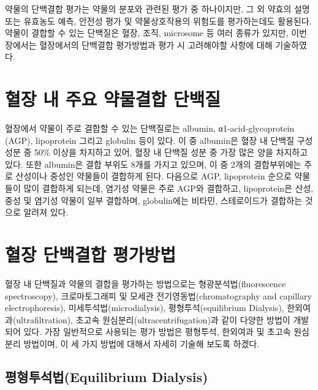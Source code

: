 \documentclass[
  11pt,
  krantz2, a4paper, twoside]{krantz}
\begin{document}
약물의 단백결합 평가는 약물의 분포와 관련된 평가 중 하나이지만, 그 외 약효의 설명 또는 유효농도 예측, 안전성 평가 및 약물상호작용의 위험도를 평가하는데도 활용된다. 약물이 결합할 수 있는 단백질은 혈장, 조직, microsome 등 여러 종류가 있지만, 이번 장에서는 혈장에서의 단백결합 평가방법과 평가 시 고려해야할 사항에 대해 기술하였다.

\hypertarget{uxd608uxc7a5-uxb0b4-uxc8fcuxc694-uxc57duxbb3cuxacb0uxd569-uxb2e8uxbc31uxc9c8}{%
\section{혈장 내 주요 약물결합 단백질}\label{uxd608uxc7a5-uxb0b4-uxc8fcuxc694-uxc57duxbb3cuxacb0uxd569-uxb2e8uxbc31uxc9c8}}

혈장에서 약물이 주로 결합할 수 있는 단백질로는 albumin,
α1-acid-glycoprotein (AGP), lipoprotein 그리고 globulin 등이 있다. 이 중
albumin은 혈장 내 단백질 구성 성분 중 50\% 이상을 차지하고 있어, 혈장 내
단백질 성분 중 가장 많은 양을 차지하고 있다. 또한 albumin은 결합 부위도
8개를 가지고 있으며, 이 중 2개의 결합부위에는 주로 산성이나 중성인
약물들이 결합하게 된다. 다음으로 AGP, lipoprotein 순으로 약물들이 많이
결합하게 되는데, 염기성 약물은 주로 AGP와 결합하고, lipoprotein은 산성,
중성 및 염기성 약물이 일부 결합하며, globulin에는 비타민, 스테로이드가
결합하는 것으로 알려져 있다.

\hypertarget{uxd608uxc7a5-uxb2e8uxbc31uxacb0uxd569-uxd3c9uxac00uxbc29uxbc95}{%
\section{혈장 단백결합 평가방법}\label{uxd608uxc7a5-uxb2e8uxbc31uxacb0uxd569-uxd3c9uxac00uxbc29uxbc95}}

혈장 내 단백질과 약물의 결합을 평가하는 방법으로는 형광분석법(fluorescence spectroscopy), 크로마토그래피 및 모세관 전기영동법(chromatography and capillary electrophoresis),
미세투석법(microdialysis), 평형투석(equilibrium Dialysis), 한외여과(ultrafiltration), 초고속 원심분리(ultracentrifugation)과 같이
다양한 방법이 개발되어 있다. 가장 일반적으로 사용되는 평가 방법은
평형투석, 한외여과 및 초고속 원심분리 방법이며, 이 세 가지 방법에 대해서
자세히 기술해 보도록 하겠다.

\hypertarget{uxd3c9uxd615uxd22cuxc11duxbc95equilibrium-dialysis}{%
\subsection{평형투석법(Equilibrium Dialysis)}\label{uxd3c9uxd615uxd22cuxc11duxbc95equilibrium-dialysis}}
\end{document}
